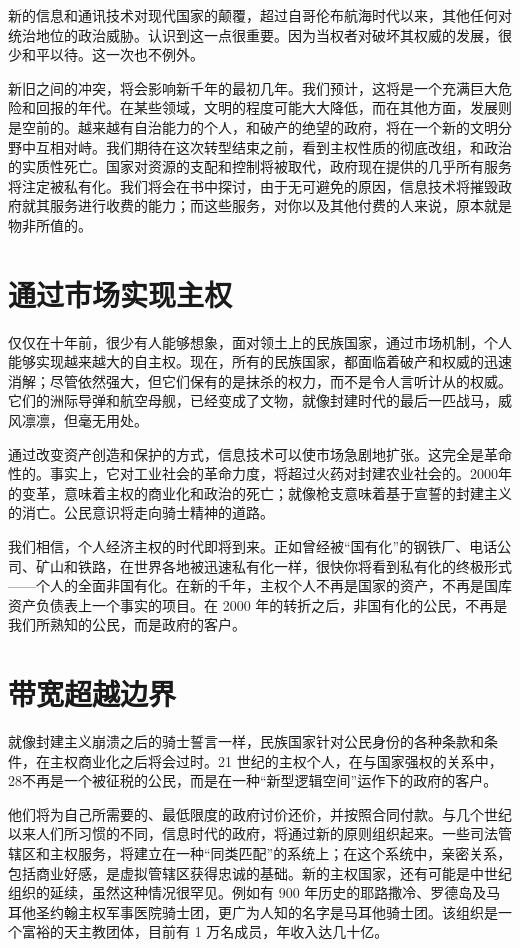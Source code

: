新的信息和通讯技术对现代国家的颠覆，超过自哥伦布航海时代以来，其他任何对统治地位的政治威胁。认识到这一点很重要。因为当权者对破坏其权威的发展，很少和平以待。这一次也不例外。


新旧之间的冲突，将会影响新千年的最初几年。我们预计，这将是一个充满巨大危险和回报的年代。在某些领域，文明的程度可能大大降低，而在其他方面，发展则是空前的。越来越有自治能力的个人，和破产的绝望的政府，将在一个新的文明分野中互相对峙。我们期待在这次转型结束之前，看到主权性质的彻底改组，和政治的实质性死亡。国家对资源的支配和控制将被取代，政府现在提供的几乎所有服务将注定被私有化。我们将会在书中探讨，由于无可避免的原因，信息技术将摧毁政府就其服务进行收费的能力；而这些服务，对你以及其他付费的人来说，原本就是物非所值的。


\section{通过市场实现主权}
仅仅在十年前，很少有人能够想象，面对领土上的民族国家，通过市场机制，个人能够实现越来越大的自主权。现在，所有的民族国家，都面临着破产和权威的迅速消解；尽管依然强大，但它们保有的是抹杀的权力，而不是令人言听计从的权威。它们的洲际导弹和航空母舰，已经变成了文物，就像封建时代的最后一匹战马，威风凛凛，但毫无用处。


通过改变资产创造和保护的方式，信息技术可以使市场急剧地扩张。这完全是革命性的。事实上，它对工业社会的革命力度，将超过火药对封建农业社会的。2000年的变革，意味着主权的商业化和政治的死亡；就像枪支意味着基于宣誓的封建主义的消亡。公民意识将走向骑士精神的道路。


我们相信，个人经济主权的时代即将到来。正如曾经被“国有化”的钢铁厂、电话公司、矿山和铁路，在世界各地被迅速私有化一样，很快你将看到私有化的终极形式——个人的全面非国有化。在新的千年，主权个人不再是国家的资产，不再是国库资产负债表上一个事实的项目。在 2000 年的转折之后，非国有化的公民，不再是我们所熟知的公民，而是政府的客户。


\section{带宽超越边界}
就像封建主义崩溃之后的骑士誓言一样，民族国家针对公民身份的各种条款和条件，在主权商业化之后将会过时。21 世纪的主权个人，在与国家强权的关系中，28不再是一个被征税的公民，而是在一种“新型逻辑空间”运作下的政府的客户。


他们将为自己所需要的、最低限度的政府讨价还价，并按照合同付款。与几个世纪以来人们所习惯的不同，信息时代的政府，将通过新的原则组织起来。一些司法管辖区和主权服务，将建立在一种“同类匹配”的系统上；在这个系统中，亲密关系，包括商业好感，是虚拟管辖区获得忠诚的基础。新的主权国家，还有可能是中世纪组织的延续，虽然这种情况很罕见。例如有 900 年历史的耶路撒冷、罗德岛及马耳他圣约翰主权军事医院骑士团，更广为人知的名字是马耳他骑士团。该组织是一个富裕的天主教团体，目前有 1 万名成员，年收入达几十亿。


